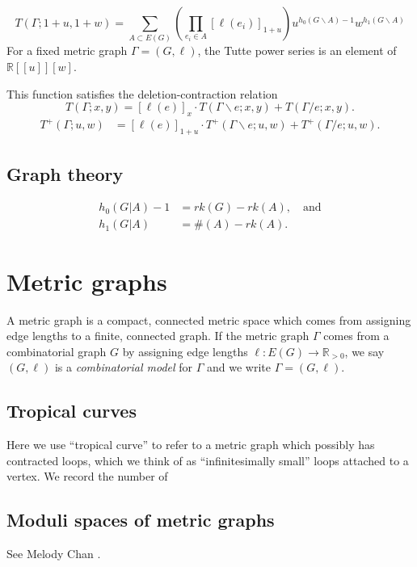 \documentclass{amsart}
\theoremstyle{definition}
\newcommand{\RR}{\mathbb{R}}
\begin{document}
\begin{equation*}
T(\Gamma; 1+u,1+w) = \sum_{A \subset E(G)} \left( \prod_{e_i \in A} [\ell(e_i)]_{1+u} \right)
u^{h_0(G\backslash A) - 1}w^{h_1(G\backslash A)}
\end{equation*}
For a fixed metric graph $\Gamma = (G,\ell)$, the Tutte power series is an element of 
$\RR[[u]][w]$.

This function satisfies the deletion-contraction relation
\begin{equation*}
T(\Gamma; x,y) = [\ell(e)]_x \cdot T(\Gamma \backslash e; x,y) + T(\Gamma / e; x,y) .
\end{equation*}
\begin{align*}
T^+({\Gamma};u,w) &= 
[\ell(e)]_{1+u} \cdot T^+(\Gamma \backslash e; u,w) 
 + T^+(\Gamma / e; u,w) .
\end{align*}

\subsection{Graph theory}
\begin{align*}
h_0(G| A) - 1 &= rk(G) - rk(A), \quad\text{and}\\
h_1(G| A) &= \#(A) - rk(A) .
\end{align*}


\section{Metric graphs}
A metric graph is a compact, connected metric space which comes from 
assigning edge lengths to a finite, connected graph.
If the metric graph $\Gamma$
comes from a combinatorial graph $G$ by 
assigning edge lengths $\ell : E(G) \to \RR_{>0}$,
we say $(G,\ell)$ is a {\em combinatorial model} for $\Gamma$
and we write $\Gamma = (G,\ell)$.


\subsection{Tropical curves}

Here we use ``tropical curve'' 
to refer to a metric graph which possibly has contracted loops,
which we think of as ``infinitesimally small'' loops attached to a vertex.
We record the number of 

\subsection{Moduli spaces of metric graphs}
See Melody Chan \cite{Cha}.
\end{document}
